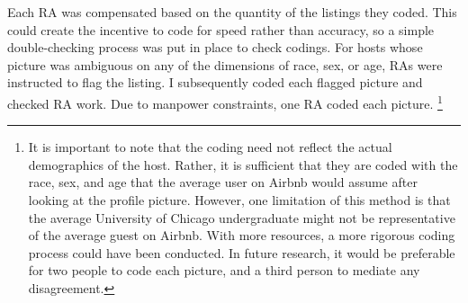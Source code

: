 Each RA was compensated based on the quantity of the listings they coded. This could create the incentive to code for speed rather than accuracy, so a simple double-checking process was put in place to check codings. For hosts whose picture was ambiguous on any of the dimensions of race, sex, or age, RAs were instructed to flag the listing. I subsequently coded each flagged picture and checked RA work. Due to manpower constraints, one RA coded each picture.%
	\footnote{It is important to note that the coding need not reflect the actual demographics of the host. Rather, it is sufficient that they are coded with the race, sex, and age that the average user on Airbnb would assume after looking at the profile picture. However, one limitation of this method is that the average University of Chicago undergraduate might not be representative of the average guest on Airbnb. With more resources, a more rigorous coding process could have been conducted. In future research, it would be preferable for two people to code each picture, and a third person to mediate any disagreement.}

\newpage	
